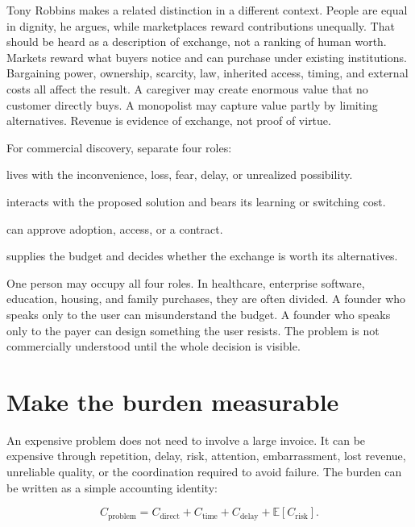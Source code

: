 Tony Robbins makes a related distinction in a different context. People are
equal in dignity, he argues, while marketplaces reward contributions unequally.
That should be heard as a description of exchange, not a ranking of human
worth. Markets reward what buyers notice and can purchase under existing
institutions. Bargaining power, ownership, scarcity, law, inherited access,
timing, and external costs all affect the result. A caregiver may create
enormous value that no customer directly buys. A monopolist may capture value
partly by limiting alternatives. Revenue is evidence of exchange, not proof of
virtue.

For commercial discovery, separate four roles:

\begin{description}[leftmargin=2.4em,style=nextline]
\item[The affected person] lives with the inconvenience, loss, fear, delay, or
  unrealized possibility.
\item[The user] interacts with the proposed solution and bears its learning or
  switching cost.
\item[The decision-maker] can approve adoption, access, or a contract.
\item[The payer] supplies the budget and decides whether the exchange is worth
  its alternatives.
\end{description}

One person may occupy all four roles. In healthcare, enterprise software,
education, housing, and family purchases, they are often divided. A founder who
speaks only to the user can misunderstand the budget. A founder who speaks only
to the payer can design something the user resists. The problem is not
commercially understood until the whole decision is visible.

\section{Make the burden measurable}

An expensive problem does not need to involve a large invoice. It can be
expensive through repetition, delay, risk, attention, embarrassment, lost
revenue, unreliable quality, or the coordination required to avoid failure.
The burden can be written as a simple accounting identity:

\begin{equation}
C_{\mathrm{problem}} = C_{\mathrm{direct}} + C_{\mathrm{time}}
  + C_{\mathrm{delay}} + \mathbb{E}[C_{\mathrm{risk}}].
\end{equation}

